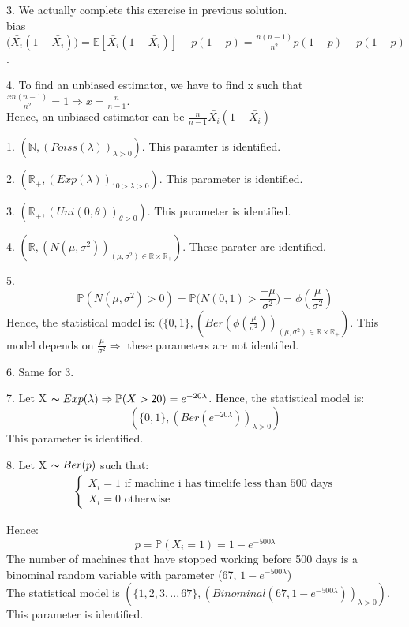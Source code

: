 \documentclass[10pt]{article}
\newenvironment{problem}[2][Problem]{\begin{trivlist}
\item[\hskip \labelsep {\bfseries #1}\hskip \labelsep {\bfseries #2.}]}{\end{trivlist}}
\begin{document}
\begin{problem}{1}
\item 3. We actually complete this exercise in previous solution.\\
bias$\Big(\bar{X_i}(1-\bar{X_i})\Big)= \mathbb{E}[\bar{X_i}(1-\bar{X_i})] - p(1-p)= \frac{n(n-1)}{n^2} p(1-p) -p(1-p)$.
\item 4. To find an unbiased estimator, we have to find x such that $\frac{xn(n-1)}{n^2}=1 \Rightarrow x=\frac{n}{n-1}$.\\
Hence, an unbiased estimator can be $\frac{n}{n-1}\bar{X_i}(1-\bar{X_i})$





\end{problem}

\begin{problem}{2}
\item 1.
$(\mathbb{N}, (Poiss(\lambda))_{\lambda>0})$. This paramter is identified.
\item 2.
$(\mathbb{R_+}, (Exp(\lambda))_{10>\lambda>0})$. This parameter is identified.
\item 3.
$(\mathbb{R_+}, (Uni(0, \theta))_{\theta >0})$. This parameter is identified.
\item 4.
$(\mathbb{R}, (N(\mu, \sigma^2))_{(\mu, \sigma^2) \in \mathbb{R} \times \mathbb{R_+}})$. These parater are identified.
\item 5.
\[\mathbb{P}(N(\mu, \sigma^2)>0)=\mathbb{P}\Big( N(0,1) > \frac{-\mu}{\sigma^2} \Big)=\phi(\frac{\mu}{\sigma^2})\]
Hence, the statistical model is: $(\{0,1\}, (Ber(\phi(\frac{\mu}{\sigma^2}))_{(\mu, \sigma^2) \in \mathbb{R} \times \mathbb{R_+}})$. This model depends on $\frac{\mu}{\sigma^2} \Rightarrow$ these parameters are not identified.
\item 6.
Same for 3.
\item 7.
Let X $\thicksim Exp(\lambda) \Rightarrow \mathbb{P}(X>20)=e^{-20\lambda}$. Hence, the statistical model is:
\[(\{ 0,1\},(Ber(e^{-20\lambda}))_{\lambda>0}) \] 
This parameter is identified.

\item 8.
Let X $\thicksim Ber(p)$ such that:
\begin{align}
    \begin{cases}
        X_{i}=1 \text{ if machine i has timelife less than 500 days} \\
        X_{i}=0 \text{ otherwise}
    \end{cases}
\end{align}

Hence: 
\[p=\mathbb{P}(X_{i}=1)=1-e^{-500\lambda}\]
The number of machines that have stopped working before 500 days is a binominal random variable with parameter (67, $1-e^{-500\lambda}$)\\
The statistical model is $(\{1,2,3,..,67 \}, (Binominal(67, 1-e^{-500\lambda}))_{\lambda>0})$. This parameter is identified.

\end{problem}
\end{document}

